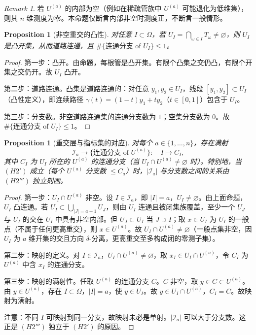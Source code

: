 \documentclass[11pt,a4paper]{article}
\newtheorem{proposition}[theorem]{Proposition}
\theoremstyle{remark}
\newtheorem{remark}[theorem]{Remark}
\begin{document}
	\begin{remark}
		若 $U^{(a)}$ 的内部为空（例如在稀疏管族中 $U^{(a)}$ 可能退化为低维集），则其 $n$ 维测度为零。本命题仅断言内部非空时测度正，不断言一般情形。
	\end{remark}
	
	\begin{proposition}[非空重交的凸性]
		对任意 $I\subset\Omega$，若 $U_I=\bigcap_{\omega\in I}T_\omega\neq\varnothing$，则 $U_I$ 是凸开集，从而道路连通，且 $\#\{\text{连通分支 of }U_I\}\le1$。
	\end{proposition}
	
	\begin{proof}
		第一步：凸开。由命题，每根管是凸开集。有限个凸集之交仍凸，有限个开集之交仍开。故 $U_I$ 凸开。
		
		第二步：道路连通。凸集是道路连通的：对任意 $y_1,y_2\in U_I$，线段 $[y_1,y_2]\subset U_I$（凸性定义），即连续路径 $\gamma(t)=(1-t)y_1+ty_2$（$t\in[0,1]$）包含于 $U_I$。
		
		第三步：分支数。非空道路连通集的连通分支数为 $1$；空集分支数为 $0$。故 $\#\{\text{连通分支 of }U_I\}\le1$。
	\end{proof}
	
	\begin{proposition}[重交层与指标集的对应]
		对每个 $a\in\{1,\ldots,n\}$，存在满射
		\[
		\mathcal I_a\longrightarrow\{\text{连通分支 of }U^{(a)}\}:\quad I\longmapsto C_I,
		\]
		其中 $C_I$ 为 $U_I$ 所在的 $U^{(a)}$ 的连通分支（当 $U_I\cap U^{(a)}\neq\varnothing$ 时）。特别地，当 $(H2')$ 成立（每个 $U^{(a)}$ 分支数 $\le C_a$）时，$|\mathcal I_a|$ 与分支数之间的关系由 $(H2''')$ 独立刻画。
	\end{proposition}
	
	\begin{proof}
		第一步：$U_I\cap U^{(a)}$ 非空。设 $I\in\mathcal I_a$，即 $|I|=a$，$U_I\neq\varnothing$。由上面命题，$U_I$ 凸连通。若 $U_I\subset\bigcup_{|J|=a+1}U_J$，则由 $U_I$ 连通且被闭集族覆盖，至少一个 $U_J$ 与 $U_I$ 的交在 $U_I$ 中具有非空内部。但 $U_J\subset U_I$ 当 $J\supset I$；取 $x\in U_I$ 为 $U_I$ 的一般点（不属于任何更高重交），则 $x\in U^{(a)}$。故 $U_I\cap U^{(a)}\neq\varnothing$（一般点集非空，因 $U_I$ 为 $a$ 维开集的交且方向 $\delta$-分离，更高重交至多构成闭的零测子集）。
		
		第二步：映射的定义。对 $I\in\mathcal I_a$，$U_I\cap U^{(a)}\neq\varnothing$，取 $x_I\in U_I\cap U^{(a)}$，令 $C_I$ 为 $U^{(a)}$ 中含 $x_I$ 的连通分支。
		
		第三步：映射的满射性。任取 $U^{(a)}$ 的连通分支 $C$。$C$ 非空，取 $y\in C\subset U^{(a)}$。由 $y\in U^{(a)}$，存在 $I\subset\Omega$，$|I|=a$，使 $y\in U_I$。故 $y\in U_I\cap U^{(a)}$，$C_I=C$。故映射为满射。
		
		注意：不同 $I$ 可映射到同一分支，故映射未必是单射。$|\mathcal I_a|$ 可以大于分支数。这正是 $(H2''')$ 独立于 $(H2')$ 的原因。
	\end{proof}
	
\end{document}
